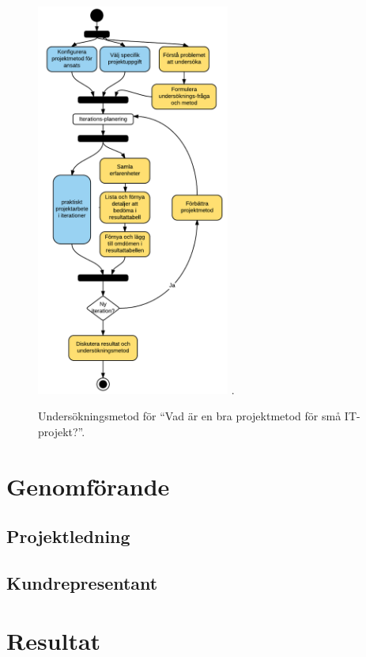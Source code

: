 \documentclass[conference]{IEEEtran}
\begin{document}
\begin{figure}[!ht]
\centering
\includegraphics[width=2.5in]{invmethod}
\DeclareGraphicsExtensions.
\caption{Undersökningsmetod för ``Vad är en bra projektmetod för små IT-projekt?''.}
\label{undersokningsmetod}
\end{figure}


\section{Genomförande}

\subsection{Projektledning}

\subsection{Kundrepresentant}

\section{Resultat}
\end{document}
